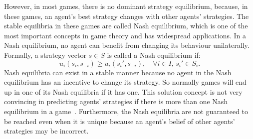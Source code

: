 \documentclass[11pt]{phdthesis}
\begin{document}
%
However, in most games, there is no dominant strategy equilibrium, because, in these games, an agent's best strategy changes with other agents' strategies. The stable equilibria in these games are called Nash equilibrium, which is one of the most important concepts in game theory and has widespread applications. In a Nash equilibrium, no agent can benefit from changing its behaviour unilaterally. Formally, a strategy vector $ s\in S $ is called a Nash equilibrium if:
\[u_i(s_i,s_{-i}) \geq u_i(s_i',s_{-i}),\quad \forall  i \in I ,\,  s_i' \in S_i.\] 
Nash equilibria can exist in a stable manner because no agent in the Nash equilibrium has an incentive to change its strategy. So normally games will end up in one of its Nash equilibria if it has one. This solution concept is not very convincing in predicting agents' strategies if there is more than one Nash equilibrium in a game~\citep{nisan2007algorithmic}. Furthermore, the Nash equilibria are not guaranteed to be reached even when it is unique because an agent's belief of other agents' strategies may be incorrect. 


\end{document}
